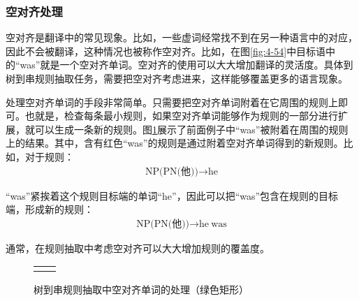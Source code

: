 
\subsubsection{空对齐处理}

\parinterval 空对齐是翻译中的常见现象。比如，一些虚词经常找不到在另一种语言中的对应，因此不会被翻译，这种情况也被称作空对齐。比如，在图\ref{fig:4-54}中目标语中的``was''就是一个空对齐单词。空对齐的使用可以大大增加翻译的灵活度。具体到树到串规则抽取任务，需要把空对齐考虑进来，这样能够覆盖更多的语言现象。

\parinterval 处理空对齐单词的手段非常简单。只需要把空对齐单词附着在它周围的规则上即可。也就是，检查每条最小规则，如果空对齐单词能够作为规则的一部分进行扩展，就可以生成一条新的规则。图\ref{fig:4-55}展示了前面例子中``was''被附着在周围的规则上的结果。其中，含有红色``was''的规则是通过附着空对齐单词得到的新规则。比如，对于规则：
\begin{eqnarray}
\textrm{NP(PN(他))} \rightarrow \textrm{he} \nonumber
\end{eqnarray}

\parinterval ``was''紧挨着这个规则目标端的单词``he''，因此可以把``was''包含在规则的目标端，形成新的规则：
\begin{eqnarray}
\textrm{NP(PN(他))} \rightarrow \textrm{he}\ \textrm{was} \nonumber
\end{eqnarray}

\parinterval 通常，在规则抽取中考虑空对齐可以大大增加规则的覆盖度。

\begin{figure}[htp]
\centering
\begin{tabular}{l l}
\subfigure{} &  \subfigure{}
\end{tabular}
\caption{树到串规则抽取中空对齐单词的处理（绿色矩形）}
\label{fig:4-55}
\end{figure}


